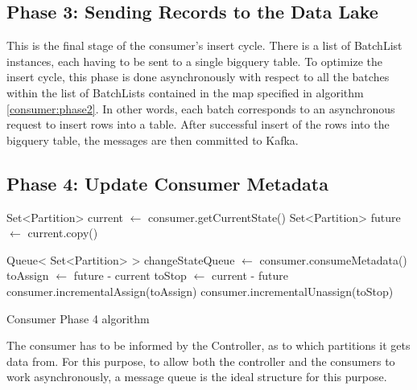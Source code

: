 \subsection{Phase 3: Sending Records to the Data Lake}

This is the final stage of the consumer's insert cycle. There is a list of
BatchList instances, each having to be sent to a single bigquery table. To
optimize the insert cycle, this phase is done asynchronously with respect to all
the batches within the list of BatchLists contained in the map specified in
algorithm \ref{consumer:phase2}. In other words, each batch corresponds to an
asynchronous request to insert rows into a table. After successful insert of the
rows into the bigquery table, the messages are then committed to Kafka. 

\subsection{Phase 4: Update Consumer Metadata}

\IncMargin{1em} 
\begin{algorithm}[h]

    Set<Partition> current $\gets$ consumer.getCurrentState()\; 
    Set<Partition> future $\gets$ current.copy()\;

    Queue< Set<Partition> > changeStateQueue $\gets$ consumer.consumeMetadata()\;
    toAssign $\gets$ future - current\; \label{algo:phase_4_toAssign} 
    toStop $\gets$ current - future\; 
    consumer.incrementalAssign(toAssign)\;
    consumer.incrementalUnassign(toStop)\; \label{algo:phase_4_incremental_assign}

\caption{Consumer Phase 4 algorithm} 
\label{algo:phase_4}
\end{algorithm}
\DecMargin{1em}

The consumer has to be informed by the Controller, as to which partitions it
gets data from. For this purpose, to allow both the controller and the consumers
to work asynchronously, a message queue is the ideal structure for this purpose.


